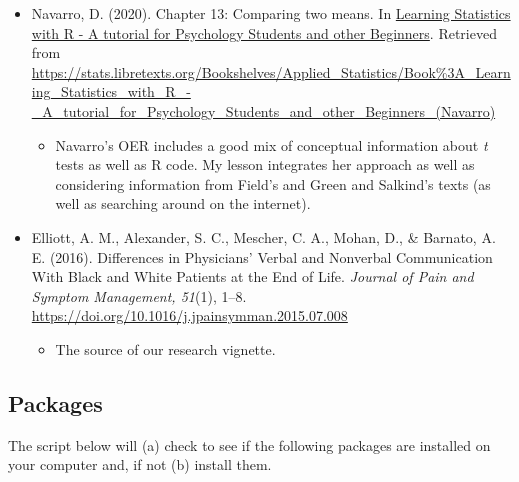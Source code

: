 \documentclass[
  11pt,
]{book}
\providecommand{\tightlist}{%
  \setlength{\itemsep}{0pt}\setlength{\parskip}{0pt}}
\begin{document}
\begin{itemize}
\tightlist
\item
  Navarro, D. (2020). Chapter 13: Comparing two means. In \href{https://learningstatisticswithr.com/}{Learning Statistics with R - A tutorial for Psychology Students and other Beginners}. Retrieved from \url{https://stats.libretexts.org/Bookshelves/Applied_Statistics/Book\%3A_Learning_Statistics_with_R_-_A_tutorial_for_Psychology_Students_and_other_Beginners_(Navarro)}

  \begin{itemize}
  \tightlist
  \item
    Navarro's OER includes a good mix of conceptual information about \emph{t} tests as well as R code. My lesson integrates her approach as well as considering information from Field's \citeyearpar{field_discovering_2012} and Green and Salkind's \citeyearpar{green_using_2014} texts (as well as searching around on the internet).
  \end{itemize}
\item
  Elliott, A. M., Alexander, S. C., Mescher, C. A., Mohan, D., \& Barnato, A. E. (2016). Differences in Physicians' Verbal and Nonverbal Communication With Black and White Patients at the End of Life. \emph{Journal of Pain and Symptom Management, 51}(1), 1--8. \url{https://doi.org/10.1016/j.jpainsymman.2015.07.008}

  \begin{itemize}
  \tightlist
  \item
    The source of our research vignette.
  \end{itemize}
\end{itemize}

\hypertarget{packages-1}{%
\subsection{Packages}\label{packages-1}}

The script below will (a) check to see if the following packages are installed on your computer and, if not (b) install them.
\end{document}
